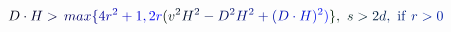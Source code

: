 \documentclass[12pt]{article}
\begin{document}
\makeatletter
\renewcommand*{\@textcolor}[3]{%
  \protect\leavevmode
  \begingroup
    \color#1{#2}#3%
  \endgroup
}
\makeatother
\begin{displaymath}
\mathcolor[RGB]{0,0,15}{D} \mathcolor[RGB]{0,0,30}{\cdot} \mathcolor[RGB]{0,0,45}{H} \mathcolor[RGB]{0,0,60}{>} \mathcolor[RGB]{0,0,75}{\operatorname*} { \mathcolor[RGB]{0,0,90}{m} \mathcolor[RGB]{0,0,105}{a} \mathcolor[RGB]{0,0,120}{x} } \mathcolor[RGB]{0,0,135}{\{} \mathcolor[RGB]{0,0,150}{4} \mathcolor[RGB]{0,0,165}{r} ^ { \mathcolor[RGB]{0,0,180}{2} } \mathcolor[RGB]{0,0,195}{+} \mathcolor[RGB]{0,0,210}{1} \mathcolor[RGB]{0,0,225}{,} \mathcolor[RGB]{0,0,240}{2} \mathcolor[RGB]{0,0,255}{r} \mathcolor[RGB]{0,15,0}{(} \mathcolor[RGB]{0,15,15}{v} ^ { \mathcolor[RGB]{0,15,30}{2} } \mathcolor[RGB]{0,15,45}{H} ^ { \mathcolor[RGB]{0,15,60}{2} } \mathcolor[RGB]{0,15,75}{-} \mathcolor[RGB]{0,15,90}{D} ^ { \mathcolor[RGB]{0,15,105}{2} } \mathcolor[RGB]{0,15,120}{H} ^ { \mathcolor[RGB]{0,15,135}{2} } \mathcolor[RGB]{0,15,150}{+} \mathcolor[RGB]{0,15,165}{(} \mathcolor[RGB]{0,15,180}{D} \mathcolor[RGB]{0,15,195}{\cdot} \mathcolor[RGB]{0,15,210}{H} \mathcolor[RGB]{0,15,225}{)} ^ { \mathcolor[RGB]{0,15,240}{2} } \mathcolor[RGB]{0,15,255}{)} \mathcolor[RGB]{0,30,0}{\}} \mathcolor[RGB]{0,30,15}{,} \ \mathcolor[RGB]{0,30,30}{s} \mathcolor[RGB]{0,30,45}{>} \mathcolor[RGB]{0,30,60}{2} \mathcolor[RGB]{0,30,75}{d} \mathcolor[RGB]{0,30,90}{,} \ \mathrm { \mathcolor[RGB]{0,30,105}{i} \mathcolor[RGB]{0,30,120}{f} } \ \mathcolor[RGB]{0,30,135}{r} \mathcolor[RGB]{0,30,150}{>} \mathcolor[RGB]{0,30,165}{0}
\end{displaymath}
\end{document}
